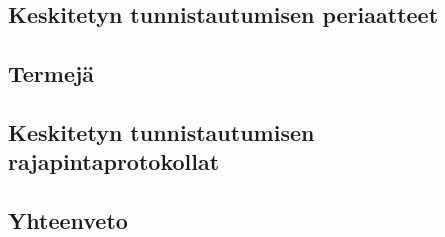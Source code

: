 
\subsection{Keskitetyn tunnistautumisen periaatteet}

\subsection{Termejä}

\subsection{Keskitetyn tunnistautumisen rajapintaprotokollat}

\subsection{Yhteenveto}

